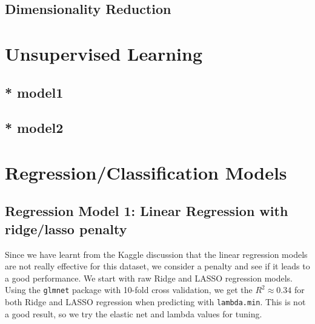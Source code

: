\documentclass[8pt]{article}
\begin{document}
\subsection{Dimensionality Reduction}


\section{Unsupervised Learning}

\subsection{* model1}


\subsection{* model2}


\section{Regression/Classification Models}

\subsection{Regression Model 1: Linear Regression with ridge/lasso penalty}
Since we have learnt from the Kaggle discussion that the linear regression models are not really effective for this dataset, 
we consider a penalty and see if it leads to a good performance. 
We start with raw Ridge and LASSO regression models. Using the \texttt{glmnet} package with 10-fold cross validation, 
we get the $R^2 \approx 0.34$ for both Ridge and LASSO regression when predicting with \texttt{lambda.min}. 
This is not a good result, so we try the elastic net and lambda values for tuning. 
\end{document}
